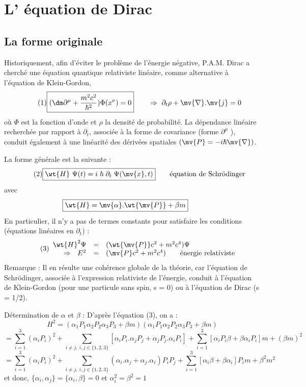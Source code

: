 \section{L' équation de Dirac}
\subsection{La forme originale}
Historiquement, afin d’éviter le problème de l’énergie négative, P.A.M. Dirac a
cherché une équation quantique relativiste linéaire, comme alternative à
l’équation de Klein-Gordon,
\[
\tag{1} \boxed{(\dm\partial^\mu+\frac{m^2c^2}{\hbar^2})\Phi(x^\nu)=0
} \qquad \Rightarrow\ \partial_t\rho+\mv{\nabla}.\mv{j}=0
\]
où $\Phi$ est la fonction d'onde et $\rho$ la densité de probabilité. La
dépendance linéaire recherchée par rapport à $\partial_t$, associée à la forme
de covariance (forme $\partial^\mu$ ), conduit également à une linéarité des
dérivées spatiales $(\mv{P}=-i\hbar\mv{\nabla})$.

La forme générale est la suivante :
\[
\tag{2} \boxed{\wt{H}\ \Psi(t)={i}\;{\hbar}\;\partial_t\;\Psi(\mv{x},t)
} \qquad \text{équation de Schrödinger}
\]
avec
\[
\boxed{\wt{H}=\mv{\alpha}.\wt{\mv{P}}+\beta m} \qquad%
\]
En particulier, il n’y a pas de termes constants pour satisfaire les conditions
(équations
linéaires en $\partial_t$) :
\[
\tag{3}
\begin{array}{ r c l }
 \wt{H}^2\Psi & = & (\wt{\mv{P}}c^2+m^2c^4)\Psi \\
 \Rightarrow\ \ E^2 & = & (\mv{P}c^2+m^2c^4) \qquad \text{énergie relativiste}
\end{array}
\]
Remarque : Il en résulte une cohérence globale de la théorie, car l’équation de
Schrödinger, associée à l’expression relativiste de l’énergie, conduit à
l’équation de Klein-Gordon (pour une particule sans spin, s = 0) ou à
l’équation de Dirac (s = 1/2).

Détermination de $\alpha$ et $\beta$ : D’après l’équation (3), on a :
\[
H^2=(\alpha_1P_1\alpha_2P_2\alpha_3P_3+\beta m)
(\alpha_1P_1\alpha_2P_2\alpha_3P_3+\beta m)
\]
\[
=\sum_{i=1}^3(\alpha_iP_i)^2+\sum_{i\neq j,\ i,j\in\{1,2,3\}}\left[
\alpha_iP_i.\alpha_jP_j+\alpha_jP_j.\alpha_iP_i\right]+
\sum_{i=1}^3\left[
\alpha_iP_i\beta+\beta\alpha_iP_i\right]m+(\beta m)^2
\]
\[
=\sum_{i=1}^3(\alpha_iP_i)^2+\sum_{i\neq j,\ i,j\in\{1,2,3\}}
(\alpha_i.\alpha_j+\alpha_j.\alpha_i)P_iP_j+
\sum_{i=1}^3\left[
\alpha_i\beta+\beta\alpha_i\right]P_im+\beta^2m^2
\]
et donc, $\{\alpha_i,\alpha_j\}=\{\alpha_i,\beta\}=0$
et $\alpha_i^2=\beta^2=1$

